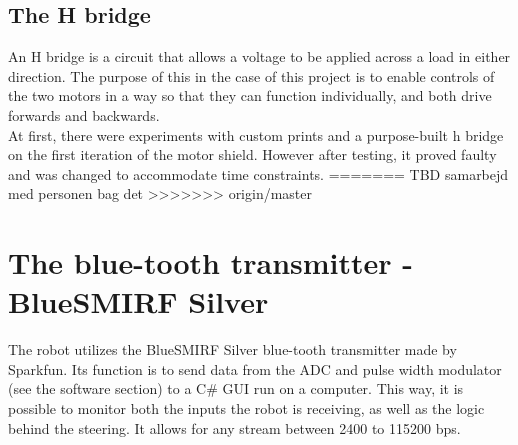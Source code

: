 \subsection{The H bridge}

An H bridge is a circuit that allows a voltage to be applied across a load in either direction. The purpose of this in the case of this project is to enable controls of the two motors in a way so that they can function individually, and both drive forwards and backwards.\\
At first, there were experiments with custom prints and a purpose-built h bridge on the first iteration of the motor shield. However after testing, it proved faulty and was changed to accommodate time constraints.
=======
TBD samarbejd med personen bag det
>>>>>>> origin/master

\section{The blue-tooth transmitter - BlueSMIRF Silver}

The robot utilizes the BlueSMIRF Silver blue-tooth transmitter made by Sparkfun. Its function is to send data from the ADC and pulse width modulator (see the software section) to a C\# GUI run on a computer. This way, it is possible to monitor both the inputs the robot is receiving, as well as the logic behind the steering. It allows for any stream between 2400 to 115200 bps. 
